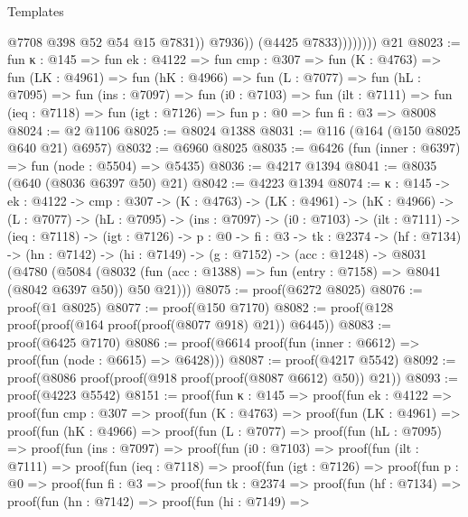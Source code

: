 \begin{lexlean}{Templates}
\begin{coremodule}
                          @7708
                          @398
                          @52
                          @54
                          @15
                          @7831))
                      @7936))
                  (@4425 @7833))))))))
    @21
@8023 := fun {κ : @145} =>
  fun {ek : @4122} =>
  fun {cmp : @307} =>
  fun (K : @4763) =>
  fun (LK : @4961) =>
  fun (hK : @4966) =>
  fun (L : @7077) =>
  fun (hL : @7095) =>
  fun (ins : @7097) =>
  fun (i0 : @7103) =>
  fun (ilt : @7111) =>
  fun (ieq : @7118) => fun (igt : @7126) => fun {p : @0} => fun {fi : @3} => @8008
@8024 := @2 @1106
@8025 := @8024 @1388
@8031 := @116 (@164 (@150 @8025 @640 @21) @6957)
@8032 := @6960 @8025
@8035 := @6426 (fun (inner : @6397) => fun (node : @5504) => @5435)
@8036 := @4217 @1394
@8041 := @8035 (@640 (@8036 @6397 @50) @21)
@8042 := @4223 @1394
@8074 := {κ : @145} ->
  {ek : @4122} ->
  {cmp : @307} ->
  (K : @4763) ->
  (LK : @4961) ->
  (hK : @4966) ->
  (L : @7077) ->
  (hL : @7095) ->
  (ins : @7097) ->
  (i0 : @7103) ->
  (ilt : @7111) ->
  (ieq : @7118) ->
  (igt : @7126) ->
  {p : @0} ->
  {fi : @3} ->
  {tk : @2374} ->
  (hf : @7134) ->
  (hn : @7142) ->
  (hi : @7149) ->
  (g : @7152) ->
  (acc : @1248) ->
  @8031
    (@4780
      (@5084 (@8032 (fun (acc : @1388) => fun (entry : @7158) => @8041 (@8042 @6397 @50)) @50 @21)))
@8075 := proof(@6272 @8025)
@8076 := proof(@1 @8025)
@8077 := proof(@150 @7170)
@8082 := proof(@128 proof(proof(@164 proof(proof(@8077 @918) @21)) @6445))
@8083 := proof(@6425 @7170)
@8086 := proof(@6614 proof(fun (inner : @6612) => proof(fun (node : @6615) => @6428)))
@8087 := proof(@4217 @5542)
@8092 := proof(@8086 proof(proof(@918 proof(proof(@8087 @6612) @50)) @21))
@8093 := proof(@4223 @5542)
@8151 := proof(fun {κ : @145} =>
    proof(fun {ek : @4122} =>
      proof(fun {cmp : @307} =>
        proof(fun (K : @4763) =>
          proof(fun (LK : @4961) =>
            proof(fun (hK : @4966) =>
              proof(fun (L : @7077) =>
                proof(fun (hL : @7095) =>
                  proof(fun (ins : @7097) =>
                    proof(fun (i0 : @7103) =>
                      proof(fun (ilt : @7111) =>
                        proof(fun (ieq : @7118) =>
                          proof(fun (igt : @7126) =>
                            proof(fun {p : @0} =>
                              proof(fun {fi : @3} =>
                                proof(fun {tk : @2374} =>
                                  proof(fun (hf : @7134) =>
                                    proof(fun (hn : @7142) =>
                                      proof(fun (hi : @7149) =>

\end{coremodule}
\end{lexlean}
